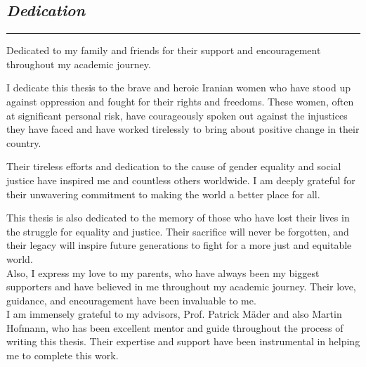 \begin{center}
    \subsection*{\textit{Dedication}}

    \rule{\linewidth}{0.5pt}

    {\selectfont
        Dedicated to my family and friends for their support and encouragement throughout my academic journey.

        I dedicate this thesis to the brave and heroic Iranian women who have stood up against oppression and fought for their rights and freedoms. These women, often at significant personal risk, have courageously spoken out against the injustices they have faced and have worked tirelessly to bring about positive change in their country.

        Their tireless efforts and dedication to the cause of gender equality and social justice have inspired me and countless others worldwide. I am deeply grateful for their unwavering commitment to making the world a better place for all.

        This thesis is also dedicated to the memory of those who have lost their lives in the struggle for equality and justice. Their sacrifice will never be forgotten, and their legacy will inspire future generations to fight for a more just and equitable world.
        \\\vspace{1cm}
        Also, I express my love to my parents, who have always been my biggest supporters and have believed in me throughout my academic journey. Their love, guidance, and encouragement have been invaluable to me.
        \\\vspace{1cm}
        I am immensely grateful to my advisors, Prof. Patrick Mäder and also Martin Hofmann, who has been excellent mentor and guide throughout the process of writing this thesis. Their expertise and support have been instrumental in helping me to complete this work.
    }

\end{center}
\normalfont

\newpage